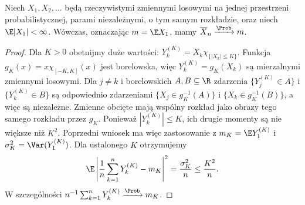 \begin{twierdzenie}
Niech $X_1,X_2,\ldots$ będą rzeczywistymi zmiennymi
losowymi na jednej przestrzeni probabilistycznej,
parami niezależnymi, o tym samym rozkładzie, oraz
niech $\E|X_1|<\infty$. Wówczas, oznaczając $m=\E X_1$,
mamy $\overline X_n\xrightarrow{\Prob}m$.
\end{twierdzenie}
\begin{proof}
Dla $K>0$ obetnijmy duże wartości:
$Y_k^{(K)}=X_k\chi_{\{|X_k|\leq K\}}$.
Funkcja $g_K(x)=x\chi_{[-K,K]}(x)$ jest borelowska,
więc $Y_k^{(K)}=g_K(X_k)$ są mierzalnymi zmiennymi
losowymi. Dla $j\ne k$ i borelowskich $A,B\subseteq\R$
zdarzenia $\{Y_j^{(K)}\in A\}$ i $\{Y_k^{(K)}\in B\}$
są odpowiednio zdarzeniami
$\{X_j\in g_K^{-1}(A)\}$ i $\{X_k\in g_K^{-1}(B)\}$,
a więc są niezależne. Zmienne obcięte mają wspólny
rozkład jako obrazy tego samego rozkładu przez $g_K$.
Ponieważ $|Y_k^{(K)}|\leq K$, ich drugie momenty są
nie większe niż $K^2$. Poprzedni wniosek ma więc zastosowanie z
$m_K=\E Y_1^{(K)}$ i $\sigma_K^2=\Var(Y_1^{(K)})$.
Dla ustalonego $K$ otrzymujemy
\[
\E\left|\frac1n\sum_{k=1}^nY_k^{(K)}-m_K\right|^2
=\frac{\sigma_K^2}{n}\leq\frac{K^2}{n}.
\]
W szczególności $n^{-1}\sum_{k=1}^nY_k^{(K)}
\xrightarrow{\Prob}m_K$.


\end{proof}
